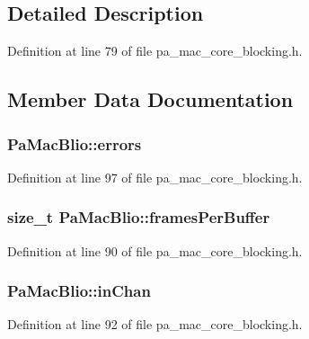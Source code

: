 \subsection{Detailed Description}


Definition at line 79 of file pa\+\_\+mac\+\_\+core\+\_\+blocking.\+h.



\subsection{Member Data Documentation}
\subsubsection[{\texorpdfstring{errors}{errors}}]{ Pa\+Mac\+Blio\+::errors}\hypertarget{struct_pa_mac_blio_a6daa032e896cb3e63523ee30fa5beca5}{}\label{struct_pa_mac_blio_a6daa032e896cb3e63523ee30fa5beca5}


Definition at line 97 of file pa\+\_\+mac\+\_\+core\+\_\+blocking.\+h.

\subsubsection[{\texorpdfstring{frames\+Per\+Buffer}{framesPerBuffer}}]{\setlength{\rightskip}{0pt plus 5cm}size\+\_\+t Pa\+Mac\+Blio\+::frames\+Per\+Buffer}\hypertarget{struct_pa_mac_blio_a58b14c4a9a8a901e7a50cbd096314c50}{}\label{struct_pa_mac_blio_a58b14c4a9a8a901e7a50cbd096314c50}


Definition at line 90 of file pa\+\_\+mac\+\_\+core\+\_\+blocking.\+h.

\subsubsection[{\texorpdfstring{in\+Chan}{inChan}}]{ Pa\+Mac\+Blio\+::in\+Chan}\hypertarget{struct_pa_mac_blio_a71952c2be07f5b97adc8ec1d2402ab45}{}\label{struct_pa_mac_blio_a71952c2be07f5b97adc8ec1d2402ab45}


Definition at line 92 of file pa\+\_\+mac\+\_\+core\+\_\+blocking.\+h.

